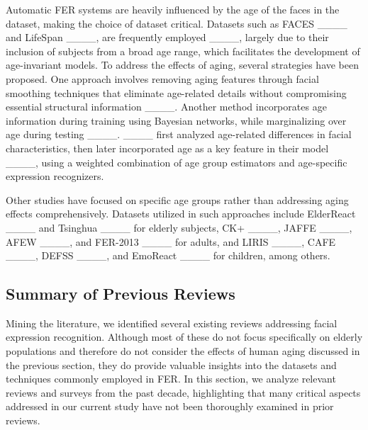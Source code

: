         Automatic FER systems are heavily influenced by the age of the faces in the dataset, making the choice of dataset critical. Datasets such as FACES ____ and LifeSpan ____, are frequently employed ____, largely due to their inclusion of subjects from a broad age range, which facilitates the development of age-invariant models. To address the effects of aging, several strategies have been proposed. One approach involves removing aging features through facial smoothing techniques that eliminate age-related details without compromising essential structural information ____. Another method incorporates age information during training using Bayesian networks, while marginalizing over age during testing ____. ____ first analyzed age-related differences in facial characteristics, then later incorporated age as a key feature in their model ____, using a weighted combination of age group estimators and age-specific expression recognizers. 
        
        Other studies have focused on specific age groups rather than addressing aging effects comprehensively. Datasets utilized in such approaches include ElderReact ____ and Tsinghua ____ for elderly subjects, CK+ ____, JAFFE ____, AFEW ____, and FER-2013 ____ for adults, and LIRIS ____, CAFE ____, DEFSS ____, and EmoReact ____ for children, among others.
        
    
    \subsection{Summary of Previous Reviews}
        
        Mining the literature, we identified several existing reviews addressing facial expression recognition. Although most of these do not focus specifically on elderly populations and therefore do not consider the effects of human aging discussed in the previous section, they do provide valuable insights into the datasets and techniques commonly employed in FER. In this section, we analyze relevant reviews and surveys from the past decade, highlighting that many critical aspects addressed in our current study have not been thoroughly examined in prior reviews.
    
